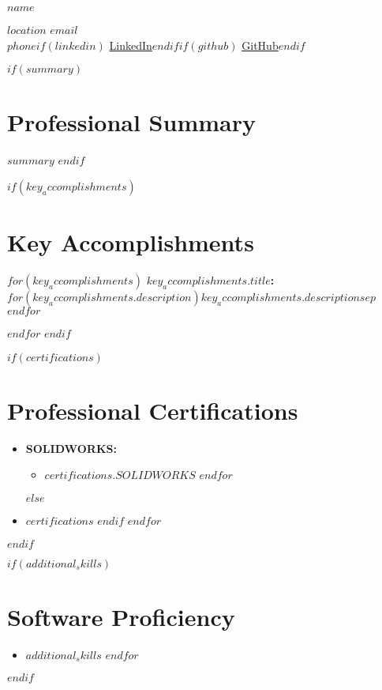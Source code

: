 \documentclass[11pt]{article}
\newcommand{\headertwocol}[2]{
\noindent
\begin{minipage}[t]{0.35\textwidth}
\raggedright
\textbf{\LARGE #1}
\end{minipage}%
\hfill
\begin{minipage}[t]{0.6\textwidth}
\raggedleft
\small #2
\end{minipage}
\vspace{0.3em}
}
\newenvironment{compactitemize}
{\begin{itemize}[leftmargin=*,itemsep=0.15em,topsep=0.1em,parsep=0em,partopsep=0em]}
{\end{itemize}}
\newenvironment{subcompactitemize}
{\begin{itemize}[leftmargin=1.5em,itemsep=0.15em,topsep=0.1em,parsep=0em,partopsep=0em]}
{\end{itemize}}
\newenvironment{accomplishments}
{\setlength{\parskip}{0.3em}\setlength{\parindent}{0em}}
{\setlength{\parskip}{0em}}
\begin{document}
\headertwocol{$name$}{$location$ \textbullet{} \href{mailto:$email$}{$email$} \\
$phone$$if(linkedin)$ \textbullet{} \href{$linkedin$}{LinkedIn}$endif$$if(github)$ \textbullet{} \href{$github$}{GitHub}$endif$}

$if(summary)$
\section{Professional Summary}
\justifying
$summary$
\vspace{0.1em}
$endif$

$if(key_accomplishments)$
\section{Key Accomplishments}
\begin{accomplishments}
$for(key_accomplishments)$
\textbf{$key_accomplishments.title$:} $for(key_accomplishments.description)$$key_accomplishments.description$$sep$ $endfor$

$endfor$
\end{accomplishments}
$endif$

$if(certifications)$
\section{Professional Certifications}
\begin{compactitemize}
$for(certifications)$
$if(certifications.SOLIDWORKS)$
\item \textbf{SOLIDWORKS:}
\begin{subcompactitemize}
$for(certifications.SOLIDWORKS)$
\item $certifications.SOLIDWORKS$
$endfor$
\end{subcompactitemize}
$else$
\item $certifications$
$endif$
$endfor$
\end{compactitemize}
$endif$

$if(additional_skills)$
\section{Software Proficiency}
\begin{compactitemize}
$for(additional_skills)$
\item $additional_skills$
$endfor$
\end{compactitemize}
$endif$
\end{document}

